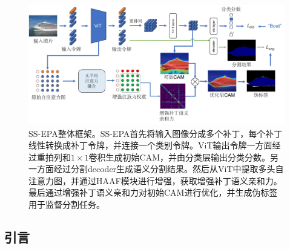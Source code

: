 \begin{figure}[htbp]
    \centerline{\includegraphics[width=6in]{fig/fig1.pdf}}
    \begin{CJK*}{UTF8}{fs}
        \caption{SS-EPA整体框架。SS-EPA首先将输入图像分成多个补丁，每个补丁线性转换成补丁令牌，并连接一个类别令牌。ViT输出令牌一方面经过重拍列和$1\times 1$卷积生成初始CAM，并由分类层输出分类分数。另一方面经过分割decoder生成语义分割结果。然后从ViT中提取多头自注意力图，并通过HAAF模块进行增强，获取增强补丁语义亲和力。最后通过增强补丁语义亲和力对初始CAM进行优化，并生成伪标签用于监督分割任务。}\label{fig1}
    \end{CJK*}
\end{figure}

\begin{CJK*}{UTF8}{zhhei}
    \vskip 1mm
    \section{引言}
\end{CJK*}

